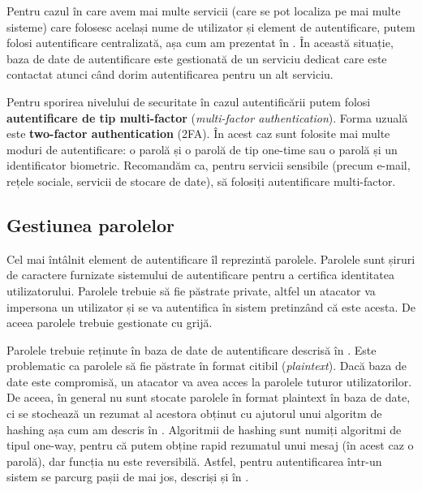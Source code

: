 Pentru cazul în care avem mai multe servicii (care se pot localiza pe mai multe sisteme) care folosesc același nume de utilizator și element de autentificare, putem folosi autentificare centralizată, așa cum am prezentat în .
În această situație, baza de date de autentificare este gestionată de un serviciu dedicat care este contactat atunci când dorim autentificarea pentru un alt serviciu.

Pentru sporirea nivelului de securitate în cazul autentificării putem folosi \textbf{autentificare de tip multi-factor} (\textit{multi-factor authentication}).
Forma uzuală este \textbf{two-factor authentication} (2FA).
În acest caz sunt folosite mai multe moduri de autentificare: o parolă și o parolă de tip one-time sau o parolă și un identificator biometric.
Recomandăm ca, pentru servicii sensibile (precum e-mail, rețele sociale, servicii de stocare de date), să folosiți autentificare multi-factor.

\subsection{Gestiunea parolelor}
\label{sec:sec:auth:password}

Cel mai întâlnit element de autentificare îl reprezintă parolele.
Parolele sunt șiruri de caractere furnizate sistemului de autentificare pentru a certifica identitatea utilizatorului.
Parolele trebuie să fie păstrate private, altfel un atacator va impersona un utilizator și se va autentifica în sistem pretinzând că este acesta.
De aceea parolele trebuie gestionate cu grijă.

Parolele trebuie reținute în baza de date de autentificare descrisă în .
Este problematic ca parolele să fie păstrate în format citibil (\textit{plaintext}).
Dacă baza de date este compromisă, un atacator va avea acces la parolele tuturor utilizatorilor.
De aceea, în general nu sunt stocate parolele în format plaintext în baza de date, ci se stochează un rezumat al acestora obținut cu ajutorul unui algoritm de hashing așa cum am descris în .
Algoritmii de hashing sunt numiți algoritmi de tipul one-way, pentru că putem obține rapid rezumatul unui mesaj (în acest caz o parolă), dar funcția nu este reversibilă.
Astfel, pentru autentificarea într-un sistem se parcurg pașii de mai jos, descriși și în .

